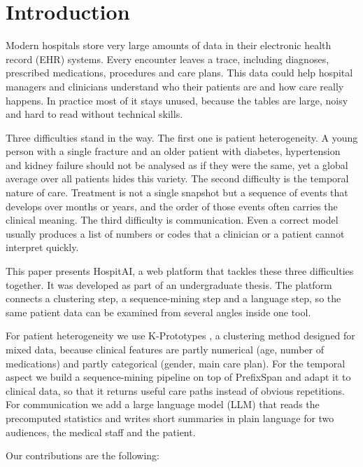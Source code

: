 
\section{Introduction}

Modern hospitals store very large amounts of data in their electronic health record (EHR) systems. Every encounter leaves a trace, including diagnoses, prescribed medications, procedures and care plans. This data could help hospital managers and clinicians understand who their patients are and how care really happens. In practice most of it stays unused, because the tables are large, noisy and hard to read without technical skills.

Three difficulties stand in the way. The first one is patient heterogeneity. A young person with a single fracture and an older patient with diabetes, hypertension and kidney failure should not be analysed as if they were the same, yet a global average over all patients hides this variety. The second difficulty is the temporal nature of care. Treatment is not a single snapshot but a sequence of events that develops over months or years, and the order of those events often carries the clinical meaning. The third difficulty is communication. Even a correct model usually produces a list of numbers or codes that a clinician or a patient cannot interpret quickly.

This paper presents HospitAI, a web platform that tackles these three difficulties together. It was developed as part of an undergraduate thesis. The platform connects a clustering step, a sequence-mining step and a language step, so the same patient data can be examined from several angles inside one tool.

For patient heterogeneity we use K-Prototypes \cite{huang1998kprototypes}, a clustering method designed for mixed data, because clinical features are partly numerical (age, number of medications) and partly categorical (gender, main care plan). For the temporal aspect we build a sequence-mining pipeline on top of PrefixSpan \cite{pei2004prefixspan} and adapt it to clinical data, so that it returns useful care paths instead of obvious repetitions. For communication we add a large language model (LLM) that reads the precomputed statistics and writes short summaries in plain language for two audiences, the medical staff and the patient.

Our contributions are the following:

